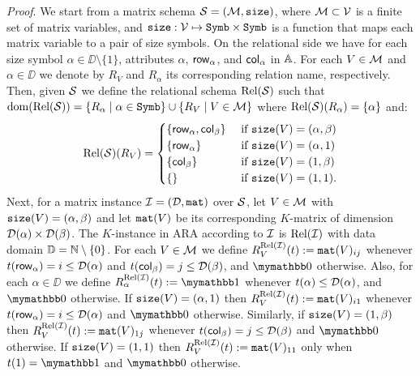 \textit{Proof}. We start from a matrix schema $\mathcal{S}=(\mathcal{M},\texttt{size})$, where $\mathcal{M}\subset \mathcal{V}$ is a finite set of matrix variables, 
and $\texttt{size}: \mathcal{V} \mapsto \texttt{Symb}\times \texttt{Symb}$ is a function that maps each matrix variable to a pair of size symbols. 
On the relational side we have for each size symbol $\alpha\in\DD\setminus\{1\}$, attributes $\alpha$, $\mathsf{row}_\alpha$, 
and $\mathsf{col}_\alpha$ in $\mathbb{A}$. For each $V\in\mathcal{M}$ and $\alpha \in \DD$ we denote
by $R_V$ and $R_\alpha$ its corresponding relation name, respectively. Then, given $\mathcal{S}$ we define the relational 
schema $\text{Rel}(\mathcal{S})$ such that $\operatorname{dom}(\text{Rel}(\mathcal{S})) =  \{R_\alpha \mid \alpha\in\texttt{Symb}\} \cup \{R_V \mid V \in \mathcal{M}\}$ 
where $\text{Rel}(\mathcal{S})(R_\alpha) = \{\alpha\}$ and:
\[
\text{Rel}(\mathcal{S})(R_V) = \begin{cases}
\lbrace\mathsf{row}_\alpha,\mathsf{col}_\beta \rbrace & \text{ if $ \texttt{size}(V)=(\alpha,\beta)$} \\
\lbrace\mathsf{row}_\alpha \rbrace & \text{ if $ \texttt{size}(V)=(\alpha,1)$} \\
\lbrace\mathsf{col}_\beta \rbrace  &
\text{ if $ \texttt{size}(V)=(1,\beta)$} \\
\lbrace\rbrace & \text{ if $\texttt{size}(V)=(1,1)$}.
\end{cases}
\]
Next, for a matrix instance $\mathcal{I} = (\mathcal{D},\texttt{mat})$ over $\mathcal{S}$,
let $V\in\mathcal{M}$ with $\texttt{size}(V)=(\alpha,\beta)$ and let $\texttt{mat}(V)$ be its corresponding $K$-matrix of dimension $\mathcal{D}(\alpha)\times \mathcal{D}(\beta)$.
The $K$-instance in ARA according to $\mathcal{I}$ is $\text{Rel}(\mathcal{I})$ with data domain $\mathbb{D} = \mathbb{N} \setminus \{0\}$. For each $V\in\mathcal{M}$ we define 
$R_V^{\text{Rel}(\mathcal{I})}(t):=\texttt{mat}(V)_{ij}$ whenever $t(\mathsf{row}_\alpha) = i \leq \mathcal{D}(\alpha)$ and $t(\mathsf{col}_\beta) = j \leq \mathcal{D}(\beta)$, and $\kzero$ otherwise. 
Also, for each $\alpha \in \DD$ we define $R_\alpha^{\text{Rel}(\I)}(t):=\kone$ whenever $t(\alpha) \leq \mathcal{D}(\alpha)$, and $\kzero$ otherwise.
If $\texttt{size}(V)=(\alpha,1)$ then $R_V^{\text{Rel}(\mathcal{I})}(t):=\texttt{mat}(V)_{i1}$ whenever $t(\mathsf{row}_\alpha) = i \leq \mathcal{D}(\alpha)$ and $\kzero$ otherwise.
Similarly, if $\texttt{size}(V)=(1,\beta)$ then $R_V^{\text{Rel}(\mathcal{I})}(t):=\texttt{mat}(V)_{1j}$ whenever $t(\mathsf{col}_\beta) = j \leq \mathcal{D}(\beta)$ and $\kzero$ otherwise.
If $\texttt{size}(V)=(1,1)$ then $R_V^{\text{Rel}(\mathcal{I})}(t):=\texttt{mat}(V)_{11}$ only when $t(1) = \kone$ and $\kzero$ otherwise.


